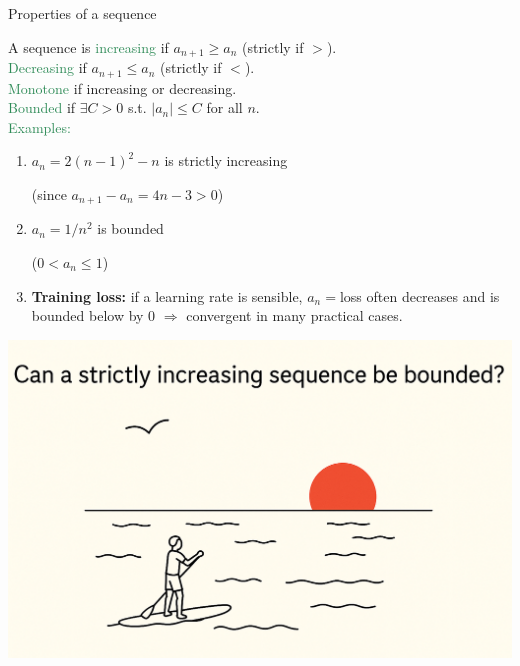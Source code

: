 \documentclass[11pt,aspectratio=169]{beamer}
\begin{document}
\begin{frame}{Properties of a sequence}

A sequence is \textcolor{SeaGreen}{increasing} if $a_{n+1}\ge a_n$ (strictly if $>$).\\[3mm]
\textcolor{SeaGreen}{Decreasing} if $a_{n+1}\le a_n$ (strictly if $<$).\\[3mm]
\textcolor{SeaGreen}{Monotone} if increasing or decreasing.\\[3mm]
\textcolor{SeaGreen}{Bounded} if $\exists C>0$ s.t. $|a_n|\le C$ for all $n$.\\[5mm]
\vskip 8pt
\textcolor{SeaGreen}{Examples:} 
\begin{enumerate}
\item $a_n=2(n-1)^2-n$ is strictly increasing \begin{tiny}(since $a_{n+1}-a_n=4n-3>0$)\end{tiny}
\item $a_n=1/n^2$ is bounded \begin{tiny}($0<a_n\le 1$)\end{tiny}
\item \textbf{Training loss:} if a learning rate is sensible, $a_n=$loss often decreases and is bounded below by $0$ $\Rightarrow$ convergent in many practical cases.
\end{enumerate}
\end{frame}

{
\begin{frame}[plain]
\centering\includegraphics[scale=0.27]{vbreaks/question1.png}
\end{frame}
}
\end{document}
